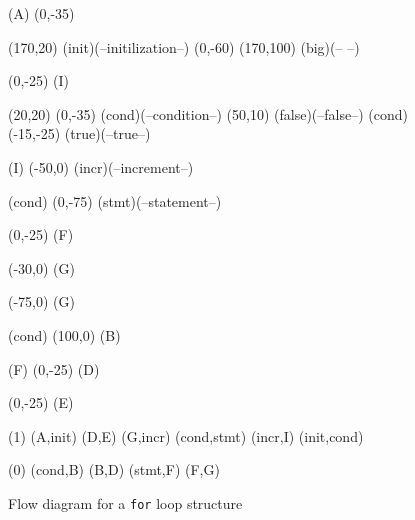 




\begin {figure}

\Draw

\FcNode(A)
\Move(0,-35)

\MinNodeSize(170,20)
\RectNode(init)(--initilization--)
{ \Move(0,-60)
\MinNodeSize(170,100)
\RectNode(big)(-- --)
}


\Move(0,-25)
\FcNode(I)

\MinNodeSize(20,20)
\Move(0,-35)
\DiamondNode(cond)(--condition--)
\Move(50,10)
\Node(false)(--false--)
\MoveToLoc(cond)
\Move(-15,-25)
\Node(true)(--true--)




\MoveToLoc(I)
\Move(-50,0)
\RectNode(incr)(--increment--)

\MoveToLoc(cond)
\Move(0,-75)
\RectNode(stmt)(--statement--)

\Move(0,-25)
\FcNode(F)

\Move(-30,0)
\FcNode(G)

\Move(-75,0)	 %
\FcNode(G)

\MoveToLoc(cond)
\Move(100,0)
\FcNode(B)

\MoveToLoc(F)
\Move(0,-25)
\FcNode(D)	 %

\Move(0,-25)
\FcNode(E)

\ArrowHeads(1)
\Edge(A,init)
\Edge(D,E)  
\VHEdge(G,incr)
\Edge(cond,stmt)
\Edge(incr,I)
\Edge(init,cond)

\ArrowHeads(0)
\Edge(cond,B)
\VHEdge(B,D)
\Edge(stmt,F)  
\Edge(F,G)  



\EndDraw


\caption {Flow diagram for a \texttt{for} loop structure}

\label {fig:forLoop}

\end {figure}


